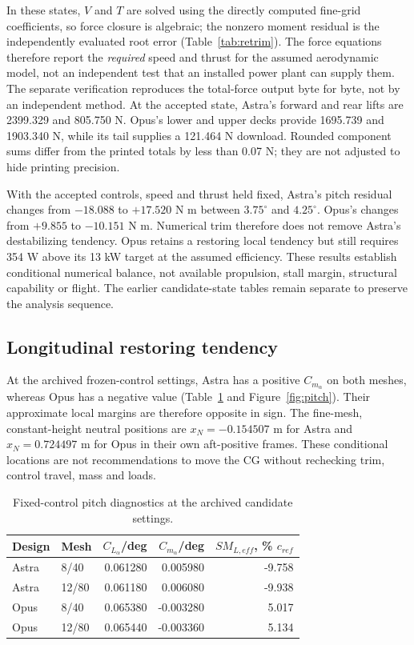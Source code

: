 \documentclass[11pt,a4paper]{article}
\begin{document}
In these states, $V$ and $T$ are solved using the directly computed fine-grid coefficients, so force closure is algebraic; the nonzero moment residual is the independently evaluated root error (Table~\ref{tab:retrim}). The force equations therefore report the \emph{required} speed and thrust for the assumed aerodynamic model, not an independent test that an installed power plant can supply them. The separate verification reproduces the total-force output byte for byte, not by an independent method. At the accepted state, Astra's forward and rear lifts are 2399.329 and 805.750 N. Opus's lower and upper decks provide 1695.739 and 1903.340 N, while its tail supplies a 121.464 N download. Rounded component sums differ from the printed totals by less than 0.07 N; they are not adjusted to hide printing precision.

With the accepted controls, speed and thrust held fixed, Astra's pitch residual changes from $-18.088$ to $+17.520$ N m between $3.75^\circ$ and $4.25^\circ$. Opus's changes from $+9.855$ to $-10.151$ N m. Numerical trim therefore does not remove Astra's destabilizing tendency. Opus retains a restoring local tendency but still requires 354 W above its 13 kW target at the assumed efficiency. These results establish conditional numerical balance, not available propulsion, stall margin, structural capability or flight. The earlier candidate-state tables remain separate to preserve the analysis sequence.

\subsection{Longitudinal restoring tendency}
At the archived frozen-control settings, Astra has a positive $C_{m_\alpha}$ on both meshes, whereas Opus has a negative value (Table~\ref{tab:stability} and Figure~\ref{fig:pitch}). Their approximate local margins are therefore opposite in sign. The fine-mesh, constant-height neutral positions are $x_N=-0.154507$ m for Astra and $x_N=0.724497$ m for Opus in their own aft-positive frames. These conditional locations are not recommendations to move the CG without rechecking trim, control travel, mass and loads.

\begin{table}[H]\centering\small
\caption{Fixed-control pitch diagnostics at the archived candidate settings.}\label{tab:stability}
\begin{tabular}{llrrr}\toprule
Design & Mesh & $C_{L_\alpha}$/deg & $C_{m_\alpha}$/deg & $SM_{L,eff}$, \% $c_{ref}$\\\midrule
Astra &8/40&0.061280&0.005980&-9.758\\
Astra &12/80&0.061180&0.006080&-9.938\\
Opus &8/40&0.065380&-0.003280&5.017\\
Opus &12/80&0.065440&-0.003360&5.134\\\bottomrule
\end{tabular}
\end{table}
\end{document}
